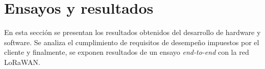 
\chapter{Ensayos y resultados} %
En esta sección se presentan los resultados obtenidos del desarrollo de hardware y software. Se analiza el cumplimiento de requisitos de desempeño impuestos por el cliente y finalmente, se exponen resultados de un ensayo \textit{end-to-end} con la red LoRaWAN.\\
\label{Chapter4} %
